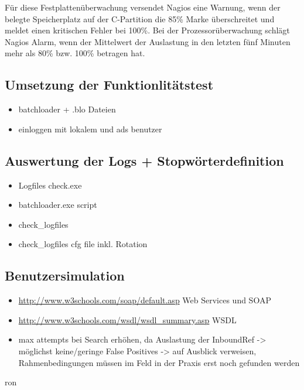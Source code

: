Für diese Festplattenüberwachung versendet Nagios eine Warnung, wenn der belegte Speicherplatz auf der C-Partition die 85\% Marke überschreitet und meldet einen kritischen Fehler bei 100\%.
Bei der Prozessorüberwachung schlägt Nagios Alarm, wenn der Mittelwert der Auslastung in den letzten fünf Minuten mehr als 80\% bzw. 100\%  betragen hat.


\subsection{Umsetzung der Funktionlitätstest}
\begin{itemize}
\item batchloader + .blo Dateien
\item einloggen mit lokalem und ads benutzer
\end{itemize}



\subsection{Auswertung der Logs + Stopwörterdefinition}
\begin{itemize}
\item Logfiles check.exe 
\item batchloader.exe script
\item check\_logfiles
\item check\_logfiles cfg file inkl. Rotation
\end{itemize}

\subsection{Benutzersimulation}





\begin{itemize}
\item \url{http://www.w3schools.com/soap/default.asp} Web Services und SOAP
\item \url{http://www.w3schools.com/wsdl/wsdl_summary.asp} WSDL
\item max attempts bei Search erhöhen, da Auslastung der InboundRef -> möglichst keine/geringe False Positives -> auf Ausblick verweisen, Rahmenbedingungen müssen im Feld in der Praxis erst noch gefunden werden
\end{itemize}ron

